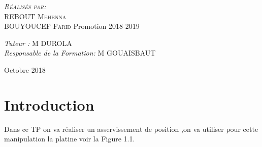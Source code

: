 \documentclass[12pt, a4paper, openany]{report}
\begin{document}
\begin{titlepage}
\begin{sffamily}
\begin{center}
    \begin{minipage}{0.4\textwidth}
      \begin{flushleft} \large
         \textsc{\emph {Réalisés par:} \\REBOUT Mehenna}\\
         \textsc{BOUYOUCEF Farid}   
          \newline
          Promotion 2018-2019 \\
      \end{flushleft}
    \end{minipage}
    \begin{minipage}{0.4\textwidth}
      \begin{flushright} \large
        \emph{Tuteur :}  \textsc{M DUROLA}\\
        \emph{Responsable de la Formation:} \textsc{M GOUAISBAUT}
      \end{flushright}
    \end{minipage}

    \vfill

    {\large Octobre 2018}

  \end{center}
  \end{sffamily}      
          
  \end{titlepage}
  
\makeatother




   
\renewcommand{\contentsname}{Sommaire}
\tableofcontents
\listoffigures
\listoftables



\chapter*{Introduction}Dans ce TP on va réaliser un asservissement de position ,on va utiliser pour cette manipulation la platine voir   la Figure 1.1.
\end{document}
